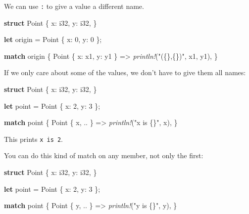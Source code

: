 \documentclass[a4paper,]{book}
\newenvironment{Shaded}{\begin{snugshade}}{\end{snugshade}}
\newcommand{\KeywordTok}[1]{\textcolor[rgb]{0.13,0.29,0.53}{\textbf{{#1}}}}
\newcommand{\DataTypeTok}[1]{\textcolor[rgb]{0.13,0.29,0.53}{{#1}}}
\newcommand{\DecValTok}[1]{\textcolor[rgb]{0.00,0.00,0.81}{{#1}}}
\newcommand{\StringTok}[1]{\textcolor[rgb]{0.31,0.60,0.02}{{#1}}}
\newcommand{\PreprocessorTok}[1]{\textcolor[rgb]{0.56,0.35,0.01}{\textit{{#1}}}}
\newcommand{\NormalTok}[1]{{#1}}
\begin{document}
We can use \texttt{:} to give a value a different name.

\begin{Shaded}
\begin{Highlighting}[]
\KeywordTok{struct} \NormalTok{Point \{}
    \NormalTok{x: }\DataTypeTok{i32}\NormalTok{,}
    \NormalTok{y: }\DataTypeTok{i32}\NormalTok{,}
\NormalTok{\}}

\KeywordTok{let} \NormalTok{origin = Point \{ x: }\DecValTok{0}\NormalTok{, y: }\DecValTok{0} \NormalTok{\};}

\KeywordTok{match} \NormalTok{origin \{}
    \NormalTok{Point \{ x: x1, y: y1 \} => }\PreprocessorTok{println!}\NormalTok{(}\StringTok{"(\{\},\{\})"}\NormalTok{, x1, y1),}
\NormalTok{\}}
\end{Highlighting}
\end{Shaded}

If we only care about some of the values, we don't have to give them all
names:

\begin{Shaded}
\begin{Highlighting}[]
\KeywordTok{struct} \NormalTok{Point \{}
    \NormalTok{x: }\DataTypeTok{i32}\NormalTok{,}
    \NormalTok{y: }\DataTypeTok{i32}\NormalTok{,}
\NormalTok{\}}

\KeywordTok{let} \NormalTok{point = Point \{ x: }\DecValTok{2}\NormalTok{, y: }\DecValTok{3} \NormalTok{\};}

\KeywordTok{match} \NormalTok{point \{}
    \NormalTok{Point \{ x, .. \} => }\PreprocessorTok{println!}\NormalTok{(}\StringTok{"x is \{\}"}\NormalTok{, x),}
\NormalTok{\}}
\end{Highlighting}
\end{Shaded}

This prints \texttt{x\ is\ 2}.

You can do this kind of match on any member, not only the first:

\begin{Shaded}
\begin{Highlighting}[]
\KeywordTok{struct} \NormalTok{Point \{}
    \NormalTok{x: }\DataTypeTok{i32}\NormalTok{,}
    \NormalTok{y: }\DataTypeTok{i32}\NormalTok{,}
\NormalTok{\}}

\KeywordTok{let} \NormalTok{point = Point \{ x: }\DecValTok{2}\NormalTok{, y: }\DecValTok{3} \NormalTok{\};}

\KeywordTok{match} \NormalTok{point \{}
    \NormalTok{Point \{ y, .. \} => }\PreprocessorTok{println!}\NormalTok{(}\StringTok{"y is \{\}"}\NormalTok{, y),}
\NormalTok{\}}
\end{Highlighting}
\end{Shaded}
\end{document}
